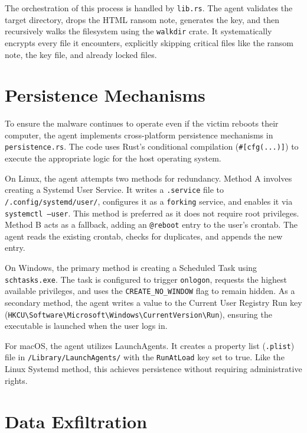 \documentclass[12pt,a4paper]{article}
\newcommand{\code}[1]{\texttt{\textcolor{primaryblue}{#1}}}
\begin{document}
The orchestration of this process is handled by \code{lib.rs}. The agent validates the target directory, drops the HTML ransom note, generates the key, and then recursively walks the filesystem using the \code{walkdir} crate. It systematically encrypts every file it encounters, explicitly skipping critical files like the ransom note, the key file, and already locked files.

\section{Persistence Mechanisms}

To ensure the malware continues to operate even if the victim reboots their computer, the agent implements cross-platform persistence mechanisms in \code{persistence.rs}. The code uses Rust's conditional compilation (\code{\#[cfg(...)]}) to execute the appropriate logic for the host operating system.

On Linux, the agent attempts two methods for redundancy. Method A involves creating a Systemd User Service. It writes a \code{.service} file to \code{\text{\textasciitilde}/.config/systemd/user/}, configures it as a \code{forking} service, and enables it via \code{systemctl --user}. This method is preferred as it does not require root privileges. Method B acts as a fallback, adding an \code{@reboot} entry to the user's crontab. The agent reads the existing crontab, checks for duplicates, and appends the new entry.

On Windows, the primary method is creating a Scheduled Task using \code{schtasks.exe}. The task is configured to trigger \code{onlogon}, requests the highest available privileges, and uses the \code{CREATE\_NO\_WINDOW} flag to remain hidden. As a secondary method, the agent writes a value to the Current User Registry Run key (\code{HKCU\textbackslash Software\textbackslash Microsoft\textbackslash Windows\textbackslash CurrentVersion\textbackslash Run}), ensuring the executable is launched when the user logs in.

For macOS, the agent utilizes LaunchAgents. It creates a property list (\code{.plist}) file in \code{\text{\textasciitilde}/Library/LaunchAgents/} with the \code{RunAtLoad} key set to true. Like the Linux Systemd method, this achieves persistence without requiring administrative rights.

\section{Data Exfiltration}
\end{document}

